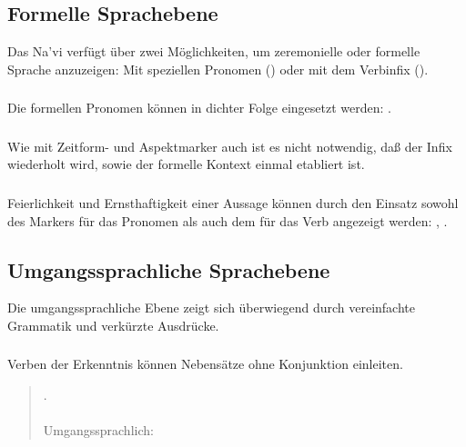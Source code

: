 \subsection{Formelle Sprachebene} Das Na’vi verf\"ugt \"uber zwei M\"oglichkeiten, um
zeremonielle oder formelle Sprache anzuzeigen: Mit speziellen Pronomen
() oder mit dem Verbinfix 
().

\subsubsection{} Die formellen Pronomen k\"onnen in dichter Folge eingesetzt werden:
 .

\subsubsection{} Wie mit Zeitform- und Aspektmarker auch ist es nicht notwendig, da\ss{}
der Infix  wiederholt wird, sowie der formelle Kontext einmal etabliert
ist.

\subsubsection{} Feierlichkeit und Ernsthaftigkeit einer Aussage k\"onnen durch den
Einsatz sowohl des Markers f\"ur das Pronomen als auch dem f\"ur das Verb angezeigt
werden: ,
.

\subsection{Umgangssprachliche Sprachebene} Die umgangssprachliche Ebene zeigt sich
\"uberwiegend durch vereinfachte Grammatik und verk\"urzte Ausdr\"ucke.

\subsubsection{} Verben der Erkenntnis k\"onnen Nebens\"atze ohne Konjunktion einleiten.

\begin{quotation}
\noindent{}. \\
\noindent{}\\
\noindent Umgangssprachlich: 
\end{quotation}


